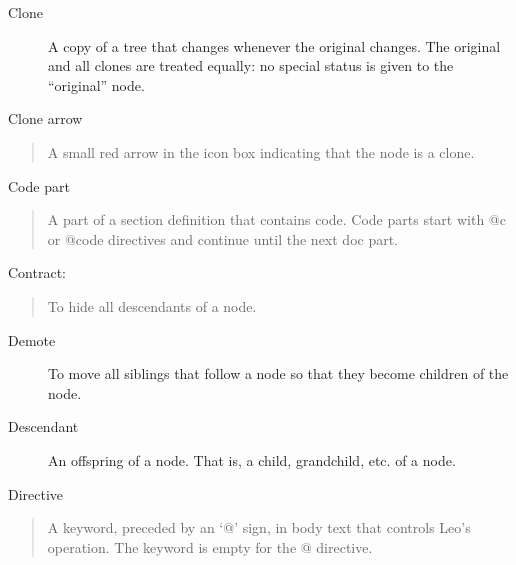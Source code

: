 \documentclass[a4paper,10pt,english]{sphinxmanual}
\begin{document}
\begin{description}
\item[{Clone}] \leavevmode
A copy of a tree that changes whenever the original changes.
The original and all clones are treated equally:
no special status is given to the ``original'' node.

\end{description}

Clone arrow
\begin{quote}

A small red arrow in the icon box indicating that the node is a clone.
\end{quote}

Code part
\begin{quote}

A part of a section definition that contains code. Code parts start with @c
or @code directives and continue until the next doc part.
\end{quote}

Contract:
\begin{quote}

To hide all descendants of a node.
\end{quote}

\begin{description}
\item[{Demote}] \leavevmode
To move all siblings that follow a node so that they become children of the node.

\end{description}

\begin{description}
\item[{Descendant}] \leavevmode
An offspring of a node.  That is, a child, grandchild, etc. of a node.

\end{description}

Directive
\begin{quote}

A keyword, preceded by an `@' sign, in body text that controls Leo's
operation. The keyword is empty for the @ directive.
\end{quote}
\end{document}
